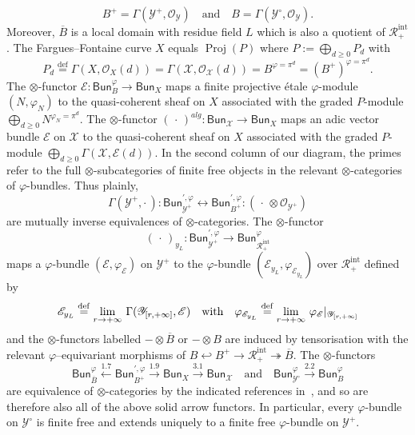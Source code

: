 \documentclass[11pt]{article}
\theoremstyle{definition}
\numberwithin{equation}{section}
\numberwithin{figure}{section}
\numberwithin{table}{section}
\newcommand{\Bun}{\mathsf{Bun}}
\DeclareMathOperator{\Proj}{Proj}
\newcommand{\eqd}{\stackrel{\mathrm{def}}{=}}
\begin{document}
\[
B^{+}=\Gamma(\mathscr{Y}^{+},\mathscr{O}_{\mathscr{Y}})\quad\text{and}\quad B=\Gamma(\mathscr{Y}^{\circ},\mathscr{O}_{\mathscr{Y}}).
\]
Moreover, $\overline{B}$ is a local domain with residue field $L$ which is also a quotient of $\mathscr{R}_{+}^{\mathrm{int}}$. The Fargues--Fontaine curve $X$ equals $\Proj(P)$ where $P:=\bigoplus_{d\geq0}P_{d}$ with
\[
P_{d}\eqd\Gamma(X,\mathcal{O}_{X}(d))=\Gamma(\mathscr{X},\mathscr{O}_{\mathscr{X}}(d))=B^{\varphi=\pi^{d}}=(B^{+})^{\varphi=\pi^{d}}.
\]
The $\otimes$-functor $\mathcal{E}:\Bun_{B}^{\varphi}\rightarrow\Bun_{X}$ maps a finite projective \'etale $\varphi$-module $(N,\varphi_{N})$ to the quasi-coherent sheaf on $X$ associated with the graded $P$-module $\bigoplus_{d\geq0}N^{\varphi_{N}=\pi^{d}}$. The $\otimes$-functor $({\,\cdot\,})^{alg}:\Bun_{\mathscr{X}}\rightarrow\Bun_{X}$ maps an adic vector bundle $\mathscr{E}$ on $\mathscr{X}$ to the quasi-coherent sheaf on $X$ associated with the graded $P$-module $\bigoplus_{d\geq0}\Gamma(\mathscr{X},\mathscr{E}(d))$. In the second column of our diagram, the primes refer to the full $\otimes$-subcategories of finite free objects in the relevant $\otimes$-categories of $\varphi$-bundles. Thus plainly,
\[
\Gamma(\mathscr{Y}^{+},{\cdot\,}):\Bun_{\mathscr{Y}^{+}}^{\prime,\varphi}\longleftrightarrow\Bun_{B^{+}}^{\prime,\varphi}:({\,\cdot\,}\otimes\mathscr{O}_{\mathscr{Y}^{+}})
\]
are mutually inverse equivalences of $\otimes$-categories. The $\otimes$-functor
\[
({\,\cdot\,})_{y_{L}}:\Bun_{\mathscr{Y}^{+}}^{\prime,\varphi}\rightarrow\Bun_{\mathscr{R}_{+}^{\mathrm{int}}}^{\varphi}
\]
maps a $\varphi$-bundle $(\mathscr{E},\varphi_{\mathscr{E}})$ on $\mathscr{Y}^{+}$ to the $\varphi$-bundle $(\mathscr{E}_{y_{L}},\varphi_{\mathscr{E}_{y_{L}}})$ over $\mathscr{R}_{+}^{\mathrm{int}}$ defined by
\[
\mathscr{E}_{y_{L}}\eqd\lim_{r\rightarrow\text{+\ensuremath{\infty}}}\,\Gamma(\mathscr{Y}_{[r,+\infty]},\mathscr{E})\quad\text{with}\quad\varphi_{\mathscr{E}_{y_{L}}}\eqd\lim_{r\rightarrow\text{+\ensuremath{\infty}}}\,\varphi_{\mathscr{E}}\vert_{\mathscr{Y}_{[r,+\infty]}}
\]
and the $\otimes$-functors labelled $-\otimes\overline{B}$ or $-\otimes B$ are induced by tensorisation with the relevant $\varphi$--equivariant morphisms of $B\hookleftarrow B^{+}\rightarrow\mathscr{R}_{+}^{\mathrm{int}}\twoheadrightarrow\overline{B}$. The $\otimes$-functors
\[
\Bun_{\overline{B}}^{\varphi}\stackrel{1.7}{\longleftarrow}\Bun_{B^{+}}^{\prime,\varphi}\stackrel{1.9}{\longrightarrow}\Bun_{X}\stackrel{3.1}{\longrightarrow}\Bun_{\mathscr{X}}\quad\text{and}\quad\Bun_{\mathscr{Y}^{\circ}}^{\varphi}\stackrel{2.2}{\longrightarrow}\Bun_{B}^{\varphi}
\]
are equivalence of $\otimes$-categories by the indicated references in~\cite[\S 11]{FaFo15}, and so are therefore also all of the above solid arrow functors. In particular, every $\varphi$-bundle on $\mathscr{Y}^{\circ}$ is finite free and extends uniquely to a finite free $\varphi$-bundle on $\mathscr{Y}^{+}$.
\end{document}
